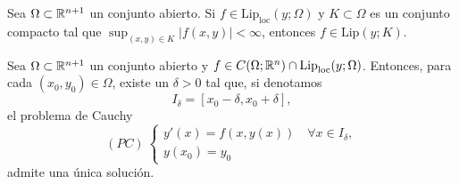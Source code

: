 \documentclass[a4paper]{report}
\begin{document}
\begin{theorem}
	Sea $\Omega \subset \mathbb{R}^{n+1}$ un conjunto abierto. Si $f \in \text{Lip}_{\text{loc}}(y;\Omega)$ y $K \subset \Omega$ es un conjunto compacto tal que $\sup_{(x,y) \in K} |f(x,y)| < \infty$, entonces $f \in \text{Lip}(y;K)$.
\end{theorem}

\begin{theorem}
	Sea $\Omega \subset \mathbb{R}^{n+1}$ un conjunto abierto y $f\in C(\Omega; \mathbb{R}^n) \cap \text{Lip}_{\text{loc}}(y;\Omega)$. Entonces, para cada $(x_0,y_0) \in \Omega$, existe un $\delta > 0$ tal que, si denotamos
	\[ I_{\delta} = [x_0 - \delta, x_0 + \delta], \]
	\noindent el problema de Cauchy
	\[ (PC)\ \begin{cases}
		y'(x) = f(x,y(x))\quad \forall x \in I_{\delta}, \\
		y(x_0) = y_0
	\end{cases} \]
	\noindent admite una única solución.
\end{theorem}
\end{document}
